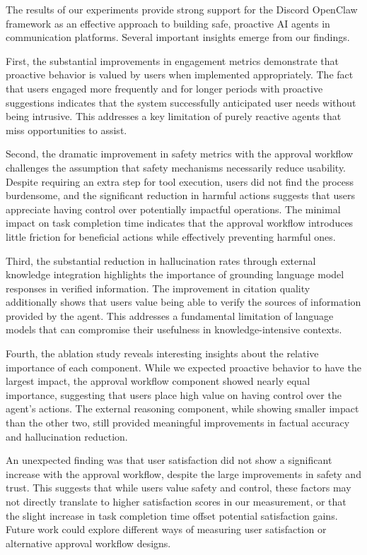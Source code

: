 The results of our experiments provide strong support for the Discord OpenClaw framework as an effective approach to building safe, proactive AI agents in communication platforms. Several important insights emerge from our findings.

First, the substantial improvements in engagement metrics demonstrate that proactive behavior is valued by users when implemented appropriately. The fact that users engaged more frequently and for longer periods with proactive suggestions indicates that the system successfully anticipated user needs without being intrusive. This addresses a key limitation of purely reactive agents that miss opportunities to assist.

Second, the dramatic improvement in safety metrics with the approval workflow challenges the assumption that safety mechanisms necessarily reduce usability. Despite requiring an extra step for tool execution, users did not find the process burdensome, and the significant reduction in harmful actions suggests that users appreciate having control over potentially impactful operations. The minimal impact on task completion time indicates that the approval workflow introduces little friction for beneficial actions while effectively preventing harmful ones.

Third, the substantial reduction in hallucination rates through external knowledge integration highlights the importance of grounding language model responses in verified information. The improvement in citation quality additionally shows that users value being able to verify the sources of information provided by the agent. This addresses a fundamental limitation of language models that can compromise their usefulness in knowledge-intensive contexts.

Fourth, the ablation study reveals interesting insights about the relative importance of each component. While we expected proactive behavior to have the largest impact, the approval workflow component showed nearly equal importance, suggesting that users place high value on having control over the agent's actions. The external reasoning component, while showing smaller impact than the other two, still provided meaningful improvements in factual accuracy and hallucination reduction.

An unexpected finding was that user satisfaction did not show a significant increase with the approval workflow, despite the large improvements in safety and trust. This suggests that while users value safety and control, these factors may not directly translate to higher satisfaction scores in our measurement, or that the slight increase in task completion time offset potential satisfaction gains. Future work could explore different ways of measuring user satisfaction or alternative approval workflow designs.

